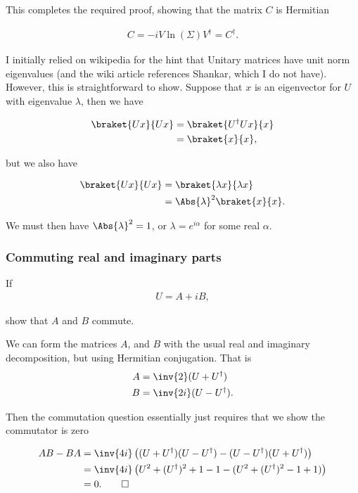 This completes the required proof, showing that the matrix $C$ is Hermitian

\begin{align}\label{eqn:desaiDiracNotes:11e}
C = -i V \ln ( \Sigma ) V^\dagger = C^\dagger.
\end{align}

I initially relied on wikipedia \citep{wiki:unitary} for the hint that Unitary matrices have unit norm eigenvalues (and the wiki article references Shankar, which I do not have).  However, this is straightforward to show.  Suppose that $x$ is an eigenvector for $U$ with eigenvalue $\lambda$, then we have

\begin{align*}
\braket{U x}{U x}
&= \braket{U^\dagger U x}{x} \\
&= \braket{x}{x},
\end{align*}

but we also have

\begin{align*}
\braket{U x}{U x}
&= \braket{\lambda x}{ \lambda x} \\
&= \Abs{\lambda}^2 \braket{x}{x}.
\end{align*}

We must then have $\Abs{\lambda}^2 = 1$, or $\lambda = e^{i\alpha}$ for some real $\alpha$.

\subsubsection{Commuting real and imaginary parts}

If 
\begin{align}\label{eqn:desaiDiracNotes:4}
U = A + iB,
\end{align}

show that $A$ and $B$ commute.

We can form the matrices $A$, and $B$ with the usual real and imaginary decomposition, but using Hermitian conjugation.  That is
\begin{align}\label{eqn:desaiDiracNotes:5}
A &=
\inv{2} ( U + U^\dagger ) \\
B &=
\inv{2i} ( U - U^\dagger ).
\end{align}

Then the commutation question essentially just requires that we show the commutator is zero

\begin{align*}
A B - B A 
&=
\inv{4i}\left( 
(U + U^\dagger) (U - U^\dagger)
- (U - U^\dagger) (U + U^\dagger)
\right) \\
&=
\inv{4i}\left( 
U^2 + (U^\dagger)^2 + 1 - 1
- (U^2 + (U^\dagger)^2 - 1 + 1 )
\right) \\
&= 0.\qquad \square
\end{align*}


